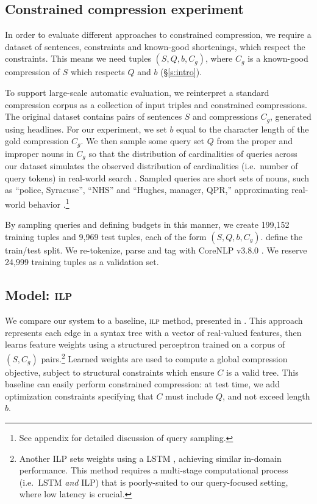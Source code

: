 \documentclass[11pt,a4paper]{article}
\begin{document}
\subsection{Constrained compression experiment}\label{s:constrained}

In order to evaluate different approaches to constrained compression, we require a dataset of sentences, constraints and known-good shortenings, which respect the constraints. This means we need tuples $(S, Q, b, C_g)$, where $C_g$ is a known-good compression of $S$ which respects $Q$ and $b$ (\S\ref{s:intro}).

To support large-scale automatic evaluation, we reinterpret a standard compression corpus \cite{filippova2013overcoming}
as a collection of input triples and constrained compressions. The original dataset contains pairs of sentences $S$ and compressions $C_g$, generated using headlines. For our experiment, we set $b$ equal to the character length of the gold compression $C_g$. We then sample some query set $Q$ from the proper and improper nouns in $C_g$ so that the distribution of cardinalities of queries across our dataset simulates the observed distribution of cardinalities (i.e.\ number of query tokens) in real-world search \cite{Jansen2000RealLR}. Sampled queries are short sets of nouns, such as ``police, Syracuse'', ``NHS'' and ``Hughes, manager, QPR,'' approximating real-world behavior \cite{Barr2008TheLS}.\footnote{See appendix for detailed discussion of query sampling.} 

By sampling queries and defining budgets in this manner, we create {199,152} training tuples and {9,969} test tuples, each of the form $(S,Q,b,C_g)$. \citet{filippova2013overcoming} define the train/test split. We re-tokenize, parse and tag with CoreNLP v3.8.0 \cite{corenlp}. We reserve 24,999 training tuples as a validation set. 

\subsection{Model: \textsc{ilp}}\label{s:ilp}

We compare our system to a baseline, \textsc{ilp} method, presented in \citet{filippova2013overcoming}. This approach represents each edge in a syntax tree with a vector of real-valued features, then learns feature weights using a structured perceptron trained on a corpus of $(S,C_g)$ pairs.\footnote{Another ILP sets weights using a LSTM \citet{Wang2017CanSH}, achieving similar in-domain performance. This method requires a multi-stage computational process (i.e.\ LSTM \textit{and} ILP) that is poorly-suited to our query-focused setting, where low latency is crucial.} Learned weights are used to compute a global compression objective, subject to structural constraints which ensure $C$ is a valid tree. This baseline can easily perform constrained compression: at test time, we add optimization constraints specifying that $C$ must include $Q$, and not exceed length $b$.
\end{document}
